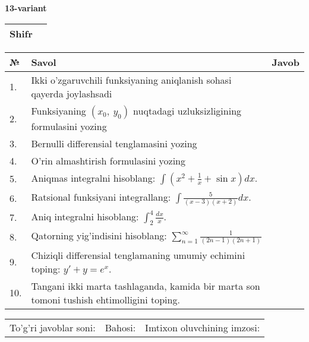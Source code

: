 \documentclass{article}
\begin{document}
  \egroup
  
  \newpage
  
  
  \textbf{13-variant}\\
  
  \bgroup
  \def\arraystretch{1.6} %
  
  \begin{tabular}{|m{5.7cm}|m{9.5cm}|}
  \hline
  Shifr & \\
  \hline
  \end{tabular}
  
  \vspace{1cm}
  
  \begin{tabular}{|m{0.7cm}|m{10cm}|m{4cm}|}
  \hline
  № & Savol & Javob \\
  \hline
  1. & Ikki o'zgaruvchili funksiyaning aniqlanish sohasi qayerda joylashsadi &  \\
  \hline
  2. & Funksiyaning \((x_{0},\ y_{0})\) nuqtadagi uzluksizligining formulasini yozing &  \\
  \hline
  3. & Bernulli differensial tenglamasini yozing &  \\
  \hline
  4. & O'rin almashtirish formulasini yozing &  \\
  \hline
  5. & Aniqmas integralni hisoblang: \(\int {\left( x^{2} + \frac{1}{x} + \sin x \right)dx}\). &  \\
  \hline
  6. & Ratsional funksiyani integrallang: \(\int {\frac{5}{(x - 3)(x + 2)}dx}\). &  \\
  \hline
  7. & Aniq integralni hisoblang: \(\int_{2}^{4}\frac{dx}{x}\). &  \\
  \hline
  8. & Qatorning yig'indisini hisoblang: \(\sum_{n = 1}^{\infty}\frac{1}{(2n - 1)(2n + 1)}\) &  \\
  \hline
  9. & Chiziqli differensial tenglamaning umumiy echimini toping: \(y' + y = e^{x}\). &  \\
  \hline
  10. & Tangani ikki marta tashlaganda, kamida bir marta son tomoni tushish ehtimolligini toping. &  \\
  \hline
  \end{tabular}
  
  \vspace{1cm}
  
  \begin{tabular}{lll}
  To'g'ri javoblar soni: \underline{\hspace{1.5cm}} & 
  Bahosi: \underline{\hspace{1.5cm}} & 
  Imtixon oluvchining imzosi: \underline{\hspace{2cm}} \\
  \end{tabular}
  
\end{document}
